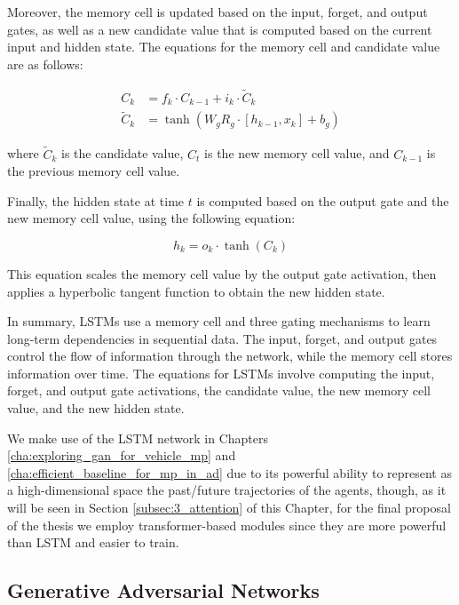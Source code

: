 Moreover, the memory cell is updated based on the input, forget, and output gates, as well as a new candidate value that is computed based on the current input and hidden state. The equations for the memory cell and candidate value are as follows:

\begin{equation}
\begin{split}
		C_k &= f_k \cdot C_{k-1} + i_k \cdot \tilde{C}_k \\
		\tilde{C}_k &= \tanh(W_g R_g \cdot [h_{k-1}, x_k] + b_g)
\end{split}
\end{equation}

where $\tilde{C}_k$ is the candidate value, $C_t$ is the new memory cell value, and $C_{k-1}$ is the previous memory cell value. 

Finally, the hidden state at time $t$ is computed based on the output gate and the new memory cell value, using the following equation:

\begin{equation}
	h_k = o_k \cdot \tanh(C_k)
\end{equation}

This equation scales the memory cell value by the output gate activation, then applies a hyperbolic tangent function to obtain the new hidden state.

In summary, \acp{LSTM} use a memory cell and three gating mechanisms to learn long-term dependencies in sequential data. The input, forget, and output gates control the flow of information through the network, while the memory cell stores information over time. The equations for \acp{LSTM} involve computing the input, forget, and output gate activations, the candidate value, the new memory cell value, and the new hidden state.

We make use of the \ac{LSTM} network in Chapters \ref{cha:exploring_gan_for_vehicle_mp} and \ref{cha:efficient_baseline_for_mp_in_ad} due to its powerful ability to represent as a high-dimensional space the past/future trajectories of the agents, though, as it will be seen in Section \ref{subsec:3_attention} of this Chapter, for the final proposal of the thesis we employ transformer-based modules since they are more powerful than \ac{LSTM} and easier to train.

\subsection{Generative Adversarial Networks}
\label{subsec:3_gans}

